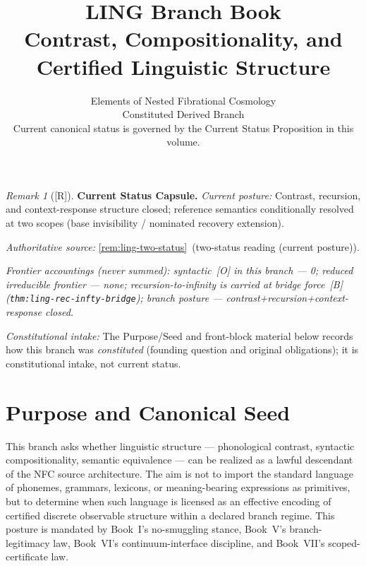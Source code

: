 \documentclass[12pt,oneside]{amsbook}
\theoremstyle{plain}
\theoremstyle{definition}
\theoremstyle{remark}
\newtheorem{remark}[theorem]{Remark}
\newcommand{\status}[1]{\textup{[#1]}}
\begin{document}
\title{LING Branch Book\\[6pt]
 Contrast, Compositionality, and Certified Linguistic Structure}
\author{Elements of Nested Fibrational Cosmology\\
 Constituted Derived Branch\\
 {\normalsize Current canonical status is governed by the Current Status Proposition in this volume.}}
\date{}
\maketitle
\tableofcontents
\newpage


\begin{remark}[\status{R}]\label{cap:LING-status}
\textbf{Current Status Capsule.}
\emph{Current posture:} Contrast, recursion, and context-response structure closed; reference semantics conditionally resolved at two scopes (base invisibility / nominated recovery extension).

\emph{Authoritative source:} \ref{rem:ling-two-status}~(two-status reading (current posture)).

\emph{Frontier accountings (never summed): syntactic~[O] in this branch --- 0; reduced irreducible frontier --- none; recursion-to-infinity is carried at bridge force~[B] (\texttt{thm:ling-rec-infty-bridge}); branch posture --- contrast+recursion+context-response closed.}

\emph{Constitutional intake:} The Purpose/Seed and front-block material below records how this branch was \emph{constituted} (founding question and original obligations); it is constitutional intake, not current status.
\end{remark}

\section{Purpose and Canonical Seed}\label{sec:ling-purpose}

This branch asks whether linguistic structure --- phonological
contrast, syntactic compositionality, semantic equivalence --- can be
realized as a lawful descendant of the NFC source architecture. The
aim is not to import the standard language of phonemes, grammars,
lexicons, or meaning-bearing expressions as primitives, but to
determine when such language is licensed as an effective encoding of
certified discrete observable structure within a declared branch regime.
This posture is mandated by Book~I's no-smuggling stance, Book~V's
branch-legitimacy law, Book~VI's continuum-interface discipline, and
Book~VII's scoped-certificate law.
\end{document}
